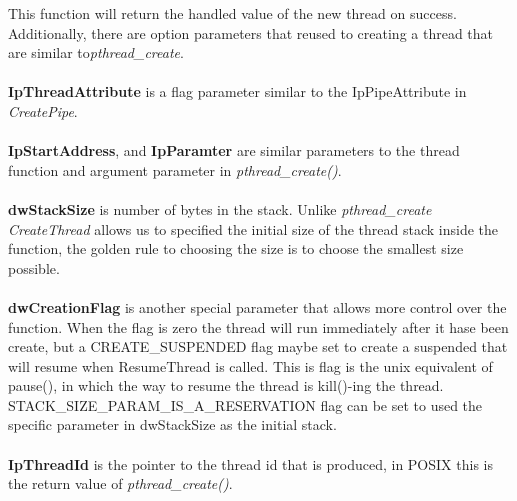 \documentclass[a4paper]{article}
\begin{document}
This function will return the handled value of the new thread on success. Additionally, there are option parameters that reused to creating a thread that are similar to\textit{pthread\_create}.\\
\\
\textbf{IpThreadAttribute} is a flag parameter similar to the IpPipeAttribute in \textit{CreatePipe}.\\
\\
\textbf{IpStartAddress}, and \textbf{IpParamter} are similar parameters to the thread function and argument parameter in\textit{ pthread\_create()}.  \\
\\
\textbf{dwStackSize} is number of bytes in the stack. Unlike \textit{pthread\_create} \textit{CreateThread} allows us to specified the initial size of the thread stack inside the function, the golden rule to choosing the size is to choose the smallest size possible.\\
\\
\textbf{dwCreationFlag} is another special parameter that allows more control over the function. When the flag is zero the thread will run immediately after it hase been create, but a CREATE\_SUSPENDED flag maybe set to create a suspended that will resume when ResumeThread is called. This is flag is the unix equivalent of pause(), in which the way to resume the thread is kill()-ing the thread. STACK\_SIZE\_PARAM\_IS\_A\_RESERVATION flag can be set to used the specific parameter in  dwStackSize as the initial stack.\\
\\
\textbf{IpThreadId} is the pointer to the thread id that is produced, in POSIX this is the return value of\textit{ pthread\_create()}.
\end{document}
